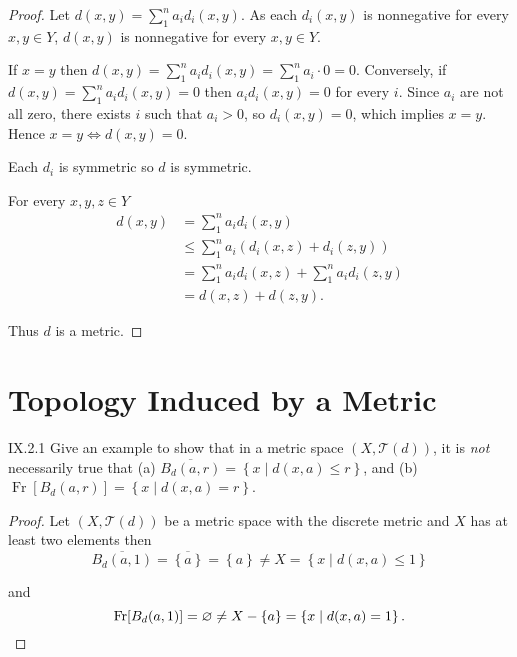 \begin{proof}
	Let \( d(x, y) = \sum^{n}_{1} a_{i} d_{i}(x, y) \). As each \( d_{i}(x, y) \) is nonnegative for every \( x, y \in Y \), \( d(x, y) \) is nonnegative for every \( x, y \in Y \).

	If \( x = y \) then \( d(x, y) = \sum^{n}_{1} a_{i} d_{i}(x, y) = \sum^{n}_{1} a_{i}\cdot 0 = 0 \). Conversely, if \( d(x, y) = \sum^{n}_{1} a_{i} d_{i}(x, y) = 0 \) then \( a_{i} d_{i}(x, y) = 0 \) for every \( i \). Since \( a_{i} \) are not all zero, there exists \( i \) such that \( a_{i} > 0 \), so \( d_{i}(x, y) = 0 \), which implies \( x = y \). Hence \( x = y \iff d(x, y) = 0 \).

	Each \( d_{i} \) is symmetric so \( d \) is symmetric.

	For every \( x, y, z \in Y \)
	\begingroup
	\allowdisplaybreaks%
	\begin{align*}
		d(x, y) & = \sum^{n}_{1} a_{i}d_{i}(x, y)                                   \\
		        & \le \sum^{n}_{1} a_{i}(d_{i}(x, z) + d_{i}(z, y))                 \\
		        & = \sum^{n}_{1} a_{i} d_{i}(x, z) + \sum^{n}_{1} a_{i} d_{i}(z, y) \\
		        & = d(x, z) + d(z, y).
	\end{align*}
	\endgroup

	Thus \( d \) is a metric.
\end{proof}

\section{Topology Induced by a Metric}

\begin{problem}{IX.2.1}
Give an example to show that in a metric space \( (X, \mathscr{T}(d)) \), it is \textit{not} necessarily true that (a) \( \overline{B_{d}(a, r)} = \left\{ x \mid d(x, a) \le r \right\} \), and (b) \( \operatorname{Fr}[B_{d}(a, r)] = \left\{ x \mid d(x, a) = r \right\} \).
\end{problem}

\begin{proof}
	Let \( (X, \mathscr{T}(d)) \) be a metric space with the discrete metric and \( X \) has at least two elements then
	\[
		\overline{B_{d}(a, 1)} = \overline{ \left\{ a \right\} } = \left\{ a \right\} \ne X = \left\{ x \mid d(x, a) \le 1 \right\}
	\]

	and
	\[
		\operatorname{Fr}[B_{d}(a, 1)] = \varnothing \ne X - \left\{ a \right\} = \left\{ x \mid d(x, a) = 1 \right\}. \qedhere
	\]
\end{proof}

